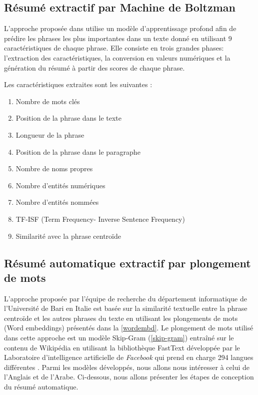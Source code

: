     \subsection{Résumé extractif par Machine de Boltzman}
    L'approche proposée dans \cite{boltzman} utilise un modèle d'apprentissage profond afin de prédire les phrases les plus importantes dans un texte donné en utilisant 9 caractéristiques de chaque phrase. Elle consiste en trois grandes phases: l'extraction des caractéristiques, la conversion en valeurs numériques et la génération du résumé à partir des scores de chaque phrase. 

    Les caractéristiques extraites sont les suivantes :
    \begin{enumerate}
        \item{Nombre de mots clés}
        \item{Position de la phrase dans le texte}
        \item{Longueur de la phrase}
        \item{Position de la phrase dans le paragraphe}
        \item{Nombre de noms propres}
        \item{Nombre d'entités numériques}
        \item{Nombre d'entités nommées}
        \item{TF-ISF (Term Frequency- Inverse Sentence Frequency)}
        \item{Similarité avec la phrase centroïde}
    \end{enumerate} 

    \subsection{Résumé automatique extractif par plongement de mots}
    L'approche proposée par l'équipe de recherche du département informatique de l'Université de Bari en Italie \cite{notreresume} est basée sur la similarité textuelle entre la phrase centroïde et les autres phrases du texte en utilisant les plongements de mots (Word embeddings) présentés dans la \autoref{wordembd}. Le plongement de mots utilisé dans cette approche est un modèle Skip-Gram (\autoref{skip-gram}) entraîné sur le contenu de Wikipédia en utilisant la bibliothèque FastText développée par le Laboratoire d'intelligence artificielle de \emph{Facebook} qui prend en charge 294 langues différentes \cite{fasttext}. Parmi les modèles développés, nous allons nous intéresser à celui de l'Anglais et de l'Arabe. Ci-dessous, nous allons présenter les étapes de conception du résumé automatique.

